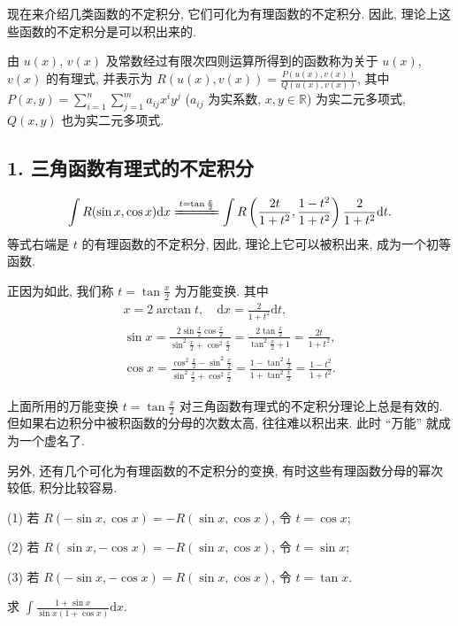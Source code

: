 现在来介绍几类函数的不定积分, 它们可化为有理函数的不定积分. 因此, 理论上这些函数的不定积分是可以积出来的.

由 $u(x)$, $v(x)$ 及常数经过有限次四则运算所得到的函数称为关于 $u(x)$, $v(x)$ 的有理式, 并表示为 $R(u(x),v(x))=\frac{P(u(x),v(x))}{Q(u(x),v(x))}$, 其中 $P(x,y)=\sum\limits_{i=1}^{n}\sum\limits_{j=1}^{m}a_{ij}x^{i}y^{j}$ ($a_{ij}$ 为实系数, $x,y\in\mathbb{R}$) 为实二元多项式, $Q(x,y)$ 也为实二元多项式.

\subsection*{1. 三角函数有理式的不定积分}

\[
\int R(\sin x,\cos x)\mathrm{d}x
\xlongequal{t=\tan\frac{x}{2}}\int R\left(\frac{2t}{1+t^{2}},\frac{1-t^{2}}{1+t^{2}}\right)\frac{2}{1+t^{2}}\mathrm{d}t.
\]
等式右端是 $t$ 的有理函数的不定积分, 因此, 理论上它可以被积出来, 成为一个初等函数.

正因为如此, 我们称 $t=\tan\frac{x}{2}$ 为万能变换. 其中
\begin{gather*}
x=2\arctan t,\quad \mathrm{d}x=\frac{2}{1+t^{2}}\mathrm{d}t,\\
\sin x=\frac{2\sin\frac{x}{2}\cos\frac{x}{2}}{\sin^{2}\frac{x}{2}+\cos^{2}\frac{x}{2}}
=\frac{2\tan\frac{x}{2}}{\tan^{2}\frac{x}{2}+1}=\frac{2t}{1+t^{2}},\\
\cos x=\frac{\cos^{2}\frac{x}{2}-\sin^{2}\frac{x}{2}}{\sin^{2}\frac{x}{2}+\cos^{2}\frac{x}{2}}
=\frac{1-\tan^{2}\frac{x}{2}}{1+\tan^{2}\frac{x}{2}}=\frac{1-t^{2}}{1+t^{2}}.
\end{gather*}

上面所用的万能变换 $t=\tan\frac{x}{2}$ 对三角函数有理式的不定积分理论上总是有效的. 但如果右边积分中被积函数的分母的次数太高, 往往难以积出来. 此时 ``万能'' 就成为一个虚名了.

另外, 还有几个可化为有理函数的不定积分的变换, 有时这些有理函数分母的幂次较低, 积分比较容易.

(1) 若 $R(-\sin x,\cos x)=-R(\sin x,\cos x)$, 令 $t=\cos x$;

(2) 若 $R(\sin x,-\cos x)=-R(\sin x,\cos x)$, 令 $t=\sin x$;

(3) 若 $R(-\sin x,-\cos x)=R(\sin x,\cos x)$, 令 $t=\tan x$.

\begin{example}\label{ex:5.3.8}
求 $\int\frac{1+\sin x}{\sin x(1+\cos x)}\mathrm{d}x$.
\end{example}

